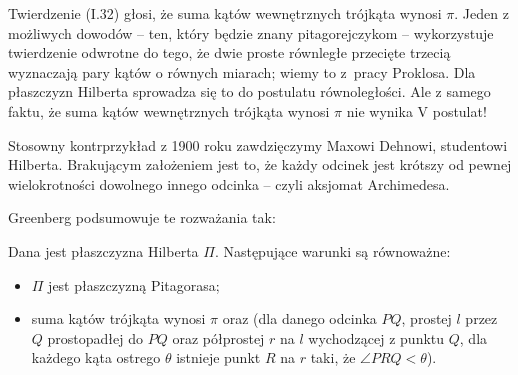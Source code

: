Twierdzenie (I.32) głosi, że suma kątów wewnętrznych trójkąta wynosi $\pi$.
%
Jeden z możliwych dowodów -- ten, który będzie znany pitagorejczykom -- wykorzystuje twierdzenie odwrotne do tego, że dwie proste równległe przecięte trzecią wyznaczają pary kątów o równych miarach; wiemy to z~pracy Proklosa.
Dla płaszczyzn Hilberta sprowadza się to do postulatu równoległości.
Ale z samego faktu, że suma kątów wewnętrznych trójkąta wynosi $\pi$ nie wynika V postulat!
%
%
%
%
%

Stosowny kontrprzykład z 1900 roku zawdzięczymy Maxowi Dehnowi, studentowi Hilberta.
%
Brakującym założeniem jest to, że każdy odcinek jest krótszy od pewnej wielokrotności dowolnego innego odcinka -- czyli aksjomat Archimedesa.
%

Greenberg podsumowuje te rozważania tak:

\begin{proposition}
    Dana jest płaszczyzna Hilberta $\Pi$.
    Następujące warunki są równoważne:
    \begin{itemize}
        \item $\Pi$ jest płaszczyzną Pitagorasa;
        \item suma kątów trójkąta wynosi $\pi$ oraz (dla danego odcinka $PQ$, prostej $l$ przez $Q$ prostopadłej do $PQ$ oraz półprostej $r$ na $l$ wychodzącej z punktu $Q$, dla każdego kąta ostrego $\theta$ istnieje punkt $R$ na $r$ taki, że $\angle PRQ < \theta$).
    \end{itemize}
\end{proposition}

%